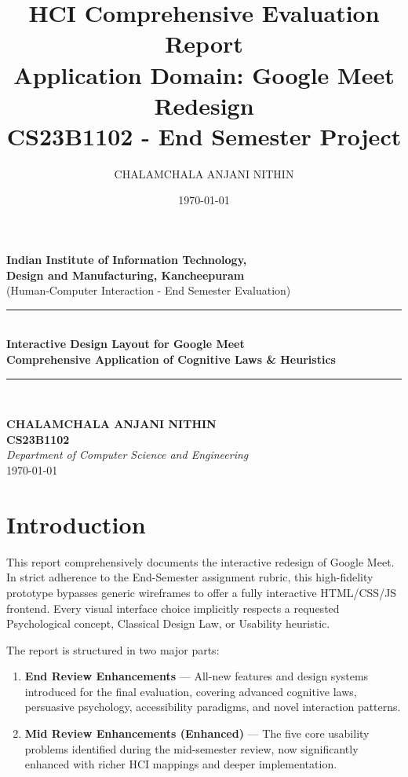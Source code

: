 \documentclass[12pt,a4paper]{article}
\title{\textbf{HCI Comprehensive Evaluation Report}\\
\large Application Domain: Google Meet Redesign\\\small CS23B1102 - End Semester Project}
\author{CHALAMCHALA ANJANI NITHIN}
\date{\today}
\begin{document}
\begin{titlepage}
\begin{center}

{\LARGE \textbf{Indian Institute of Information Technology,\\
Design and Manufacturing, Kancheepuram}}\\[1.5cm]

{\large (Human-Computer Interaction - End Semester Evaluation)}\\[3cm]

\rule{\linewidth}{0.5pt}\\[0.4cm]
{\Huge \textbf{Interactive Design Layout for Google Meet}}\\[0.3cm]
{\Large \textbf{Comprehensive Application of Cognitive Laws \& Heuristics}}\\[0.3cm]
\rule{\linewidth}{0.5pt}\\[2cm]

\vfill

\textbf{CHALAMCHALA ANJANI NITHIN}\\[0.2cm]
\textbf{CS23B1102}\\[0.2cm]
\textit{Department of Computer Science and Engineering}\\[0.5cm]

{\large \today}

\end{center}
\end{titlepage}

\newpage
\tableofcontents
\newpage

\section{Introduction}
This report comprehensively documents the interactive redesign of Google Meet. In strict adherence to the End-Semester assignment rubric, this high-fidelity prototype bypasses generic wireframes to offer a fully interactive HTML/CSS/JS frontend. Every visual interface choice implicitly respects a requested Psychological concept, Classical Design Law, or Usability heuristic.

The report is structured in two major parts:
\begin{enumerate}
    \item \textbf{End Review Enhancements} — All-new features and design systems introduced for the final evaluation, covering advanced cognitive laws, persuasive psychology, accessibility paradigms, and novel interaction patterns.
    \item \textbf{Mid Review Enhancements (Enhanced)} — The five core usability problems identified during the mid-semester review, now significantly enhanced with richer HCI mappings and deeper implementation.
\end{enumerate}
\end{document}
